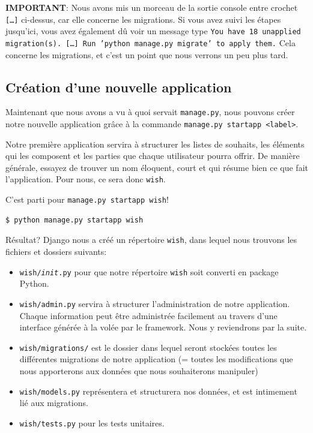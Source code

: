 \documentclass[11pt]{amsbook}
\newcommand{\admonition}[2]{\textbf{#1}: {#2}}
\begin{document}
\admonition{IMPORTANT}{Nous avons mis un morceau de la sortie console entre crochet \texttt{[…​]} ci-dessus, car elle concerne les migrations.
Si vous avez suivi les étapes jusqu’ici, vous avez également dû voir un message type \texttt{You have 18 unapplied migration(s). […​] Run 'python manage.py migrate' to apply them.}
Cela concerne les migrations, et c’est un point que nous verrons un peu plus tard.}
\hypertarget{x-création-d’une-nouvelle-application}{\subsection{Création d’une nouvelle application}}
Maintenant que nous avons a vu à quoi servait \texttt{manage.py}, nous pouvons créer notre nouvelle application grâce à la commande \texttt{manage.py startapp <label>}.


Notre première application servira à structurer les listes de souhaits, les éléments qui les composent et les parties que chaque utilisateur pourra offrir.
De manière générale, essayez de trouver un nom éloquent, court et qui résume bien ce que fait l’application.
Pour nous, ce sera donc \texttt{wish}.


C’est parti pour \texttt{manage.py startapp wish}!


\begin{verbatim}
$ python manage.py startapp wish
\end{verbatim}

Résultat? Django nous a créé un répertoire \texttt{wish}, dans lequel nous trouvons les fichiers et dossiers suivants:


\begin{itemize}

\item \texttt{wish/\emph{init}.py} pour que notre répertoire \texttt{wish} soit converti en package Python.

\item \texttt{wish/admin.py} servira à structurer l’administration de notre application. Chaque information peut être administrée facilement au travers d’une interface générée à la volée par le framework. Nous y reviendrons par la suite.

\item \texttt{wish/migrations/} est le dossier dans lequel seront stockées toutes les différentes migrations de notre application (= toutes les modifications que nous apporterons aux données que nous souhaiterons manipuler)

\item \texttt{wish/models.py} représentera et structurera nos données, et est intimement lié aux migrations.

\item \texttt{wish/tests.py} pour les tests unitaires.

\end{itemize}
\end{document}

